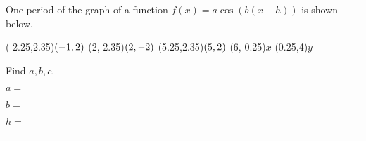 \documentclass[11pt,answers]{exam}
\let\originalleft\left
\let\originalright\right
\renewcommand{\left}{\mathopen{}\mathclose\bgroup\originalleft}
\renewcommand{\right}{\aftergroup\egroup\originalright}
\begin{document}
\begin{questions}
\begin{parts}
\end{parts}	

\question[3] One period of the graph of a function $\displaystyle f(x)=a\cos(b(x-h))$ is shown below.

\begin{minipage}[t][][b]{0.5\textwidth}	
\begin{center}
	
	\begin{mfpic}[25]{-2}{6}{-3}{4}
		\tlabel(-2.25,2.35){\tiny $\left(-1,2\right)$}
		\tlabel[cc](2,-2.35){\tiny $\left(2,-2\right)$}
		\tlabel(5.25,2.35){\tiny $\left(5,2\right)$}
		\axes
		\tlabel[cc](6,-0.25){\scriptsize $x$}
		\tlabel[cc](0.25,4){\scriptsize $y$}
		\tlpointsep{4pt}
		\dotted {}
		\dotted {}
	\end{mfpic}
	
\end{center}
\end{minipage}
\begin{minipage}[t][][b]{0.5\textwidth}	
Find $a,b,c$.
\bigskip

$a=$ \dotfill
\bigskip

$b=$ \dotfill
\bigskip

$h=$ \dotfill
\end{minipage}				
\end{questions}
\newpage
\par\medskip\hrule\medskip
\end{document}
